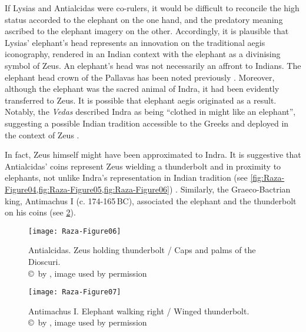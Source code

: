 \documentclass{ijsra}
\renewcommand\BC{{\,BC\xspace}}
\begin{document}
If Lysias and Antialcidas were co-rulers, it would be difficult to reconcile the high status accorded to the elephant on the one hand, and the predatory meaning ascribed to the elephant imagery on the other.
Accordingly, it is plausible that Lysias’ elephant’s head represents an innovation on the traditional aegis iconography, rendered in an Indian context with the elephant as a divinising symbol of Zeus.
An elephant’s head was not necessarily an affront to Indians. The elephant head crown of the Pallavas has been noted previously \parencite[66--70]{Hudson2008}. 
Moreover, although the elephant was the sacred animal of Indra, it had been evidently transferred to Zeus.
It is possible that elephant aegis originated as a result.
Notably, the \emph{Vedas} described Indra as being “clothed in might like an elephant”, suggesting a possible Indian tradition accessible to the Greeks and deployed in the context of Zeus \parencite[22]{Gupta1983}. 

In fact, Zeus himself might have been approximated to Indra.
It is suggestive that Antialcidas’ coins represent Zeus wielding a thunderbolt and in proximity to elephants, not unlike Indra’s representation in Indian tradition (see \cref{fig:Raza-Figure04,fig:Raza-Figure05,fig:Raza-Figure06}) \parencite[242--247]{MacDowall2007b}.
Similarly, the Graeco-Bactrian king, Antimachus I (c. 174-165\BC), associated the elephant and the thunderbolt on his coins (see \cref{fig:Raza-Figure07}). 

\begin{figure}[!htb] %
	\centering
	\texttt{[image: Raza-Figure06]}
	\caption{Antialcidas. Zeus holding thunderbolt / Caps and palms of the Dioscuri.
		{\normalfont\scriptsize \\ \copyright\ by \cite{Coin}, image used by permission}}
	\label{fig:Raza-Figure06}
\end{figure}

\begin{figure}[!htb] %
	\centering
	\texttt{[image: Raza-Figure07]}
	\caption{Antimachus I. Elephant walking right / Winged thunderbolt.
		{\normalfont\scriptsize \\ \copyright\ by \cite{Coin}, image used by permission}}
	\label{fig:Raza-Figure07}
\end{figure}
\end{document}

